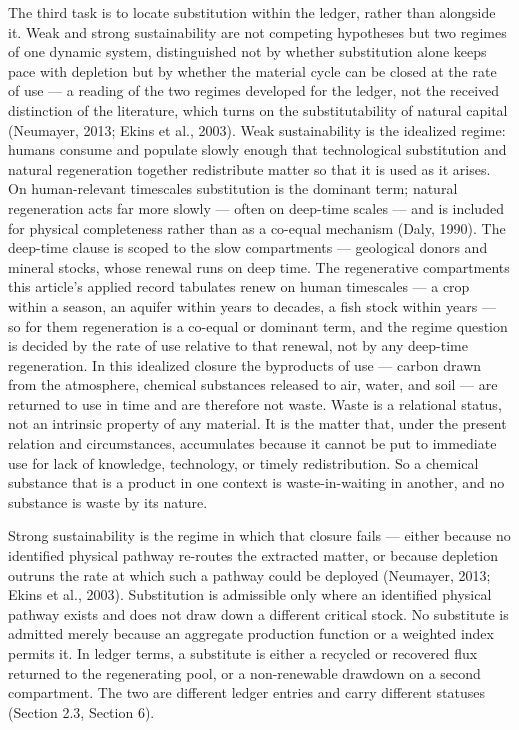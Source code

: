 \documentclass[11pt]{article}
\begin{document}
The third task is to locate substitution within the ledger, rather than
alongside it. Weak and strong sustainability are not competing
hypotheses but two regimes of one dynamic system, distinguished not by
whether substitution alone keeps pace with depletion but by whether the
material cycle can be closed at the rate of use --- a reading of the two
regimes developed for the ledger, not the received distinction of the
literature, which turns on the substitutability of natural capital
(Neumayer, 2013; Ekins et al., 2003). Weak sustainability is the
idealized regime: humans consume and populate slowly enough that
technological substitution and natural regeneration together
redistribute matter so that it is used as it arises. On human-relevant
timescales substitution is the dominant term; natural regeneration acts
far more slowly --- often on deep-time scales --- and is included for
physical completeness rather than as a co-equal mechanism (Daly, 1990).
The deep-time clause is scoped to the slow compartments --- geological
donors and mineral stocks, whose renewal runs on deep time. The
regenerative compartments this article's applied record tabulates renew
on human timescales --- a crop within a season, an aquifer within years
to decades, a fish stock within years --- so for them regeneration is a
co-equal or dominant term, and the regime question is decided by the
rate of use relative to that renewal, not by any deep-time regeneration.
In this idealized closure the byproducts of use --- carbon drawn from
the atmosphere, chemical substances released to air, water, and soil ---
are returned to use in time and are therefore not waste. Waste is a
relational status, not an intrinsic property of any material. It is the
matter that, under the present relation and circumstances, accumulates
because it cannot be put to immediate use for lack of knowledge,
technology, or timely redistribution. So a chemical substance that is a
product in one context is waste-in-waiting in another, and no substance
is waste by its nature.

Strong sustainability is the regime in which that closure fails ---
either because no identified physical pathway re-routes the extracted
matter, or because depletion outruns the rate at which such a pathway
could be deployed (Neumayer, 2013; Ekins et al., 2003). Substitution is
admissible only where an identified physical pathway exists and does not
draw down a different critical stock. No substitute is admitted merely
because an aggregate production function or a weighted index permits it.
In ledger terms, a substitute is either a recycled or recovered flux
returned to the regenerating pool, or a non-renewable drawdown on a
second compartment. The two are different ledger entries and carry
different statuses (Section 2.3, Section 6).
\end{document}
